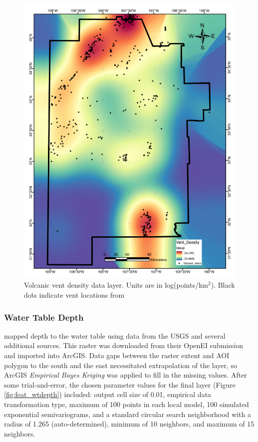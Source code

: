 \begin{figure}[!htp]
\centering
\includegraphics[scale=.50]{templates/images/Figure-VentDensity.pdf}
\caption[Volcanic vent data layer]{Volcanic vent density data layer. Units are in log(points/km$^2$). Black dots indicate vent locations from \protect\citep{nmbgmr_nmbgmr_2021}}
\label{fig:feat_vents}
\end{figure}

\subsubsection{Water Table Depth}

\citet{bielicki_hydrogeolgic_2015} mapped depth to the water table using data from the USGS and several additional sources. This raster was downloaded from their OpenEI submission \citep{kelley_geothermal_2015} and imported into ArcGIS. Data gaps between the raster extent and AOI polygon to the south and the east necessitated extrapolation of the layer, so ArcGIS \textit{Empirical Bayes Kriging} was applied to fill in the missing values. After some trial-and-error, the chosen parameter values for the final layer (Figure \ref{fig:feat_wtdepth}) included: output cell size of 0.01, empirical data transformation type, maximum of 100 points in each local model, 100 simulated exponential semivariograms, and a standard circular search neighborhood with a radius of 1.265 (auto-determined), minimum of 10 neighbors, and maximum of 15 neighbors.

